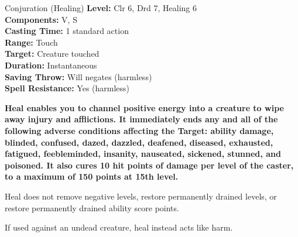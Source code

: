 {Conjuration (Healing)}
{
	\textbf{Level:}
	Clr 6, Drd 7, Healing 6\\
	\textbf{Components:}
	V, S\\
	\textbf{Casting Time:}
	1 standard action\\
	\textbf{Range:}
	Touch\\
	\textbf{Target:}
	Creature touched\\
	\textbf{Duration:}
	Instantaneous\\
	\textbf{Saving Throw:}
	Will negates (harmless)\\
	\textbf{Spell Resistance:}
	Yes (harmless)\\
}
{
	\textbf{	Heal enables you to channel positive energy into a creature to wipe away injury and afflictions. It immediately ends any and all of the following adverse conditions affecting the Target: ability damage, blinded, confused, dazed, dazzled, deafened, diseased, exhausted, fatigued, feebleminded, insanity, nauseated, sickened, stunned, and poisoned. It also cures 10 hit points of damage per level of the caster, to a maximum of 150 points at 15th level.}

	Heal does not remove negative levels, restore permanently drained levels, or restore permanently drained ability score points.

	If used against an undead creature, heal instead acts like harm.

}
